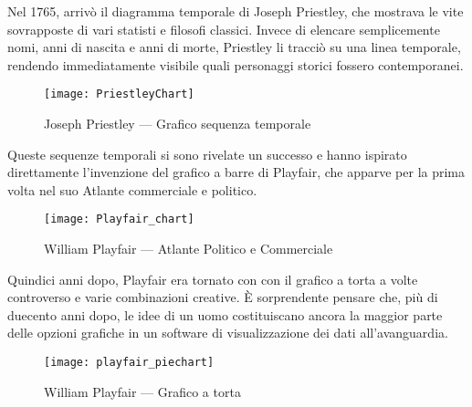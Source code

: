 
\noindent Nel 1765, arrivò il diagramma temporale di Joseph Priestley, che mostrava le vite sovrapposte di vari statisti e filosofi classici. 
Invece di elencare semplicemente nomi, anni di nascita e anni di morte, Priestley li tracciò su una linea temporale, rendendo immediatamente visibile quali personaggi storici fossero contemporanei.

\begin{figure}[htp]
    \centering
    \texttt{[image: PriestleyChart]}
    \caption{Joseph Priestley — Grafico sequenza temporale}
    \label{fig:PriestleyChart}
\end{figure}

\noindent Queste sequenze temporali si sono rivelate un successo e hanno ispirato direttamente l'invenzione del grafico a barre di Playfair, che apparve per la prima volta nel suo Atlante commerciale e politico.

\begin{figure}[htp]
    \centering
    \texttt{[image: Playfair\_chart]}
    \caption{William Playfair — Atlante Politico e Commerciale}
    \label{fig:playfair_chart}
\end{figure}

\noindent Quindici anni dopo, Playfair era tornato con con il grafico a torta a volte controverso e varie combinazioni creative. È sorprendente pensare che, più di duecento anni dopo, le idee di un uomo costituiscano ancora la maggior parte delle opzioni grafiche in un software di visualizzazione dei dati all'avanguardia.

\begin{figure}[htp]
    \centering
    \texttt{[image: playfair\_piechart]}
    \caption{William Playfair — Grafico a torta}
    \label{fig:playfair_piechart}
\end{figure}




